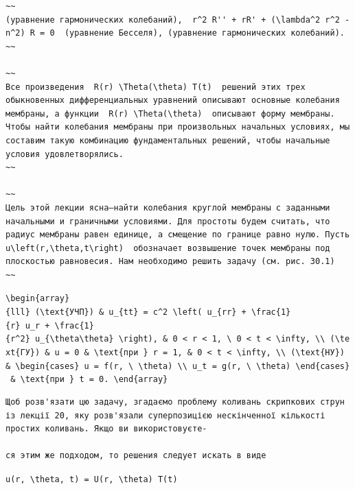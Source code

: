 \documentclass[
  ukrainian,
]{article}
\begin{document}
\begin{verbatim}
~~
(уравнение гармонических колебаний),  r^2 R'' + rR' + (\lambda^2 r^2 - n^2) R = 0  (уравнение Бесселя), (уравнение гармонических колебаний).
~~

~~
Все произведения  R(r) \Theta(\theta) T(t)  решений этих трех обыкновенных дифференциальных уравнений описывают основные колебания мембраны, а функции  R(r) \Theta(\theta)  описывают форму мембраны. Чтобы найти колебания мембраны при произвольных начальных условиях, мы составим такую комбинацию фундаментальных решений, чтобы начальные условия удовлетворялись.
~~

~~
Цель этой лекции ясна—найти колебания круглой мембраны с заданными начальными и граничными условиями. Для простоты будем считать, что радиус мембраны равен единице, а смещение по границе равно нулю. Пусть  u\left(r,\theta,t\right)  обозначает возвышение точек мембраны под плоскостью равновесия. Нам необходимо решить задачу (см. рис. 30.1)
~~
\end{verbatim}

\texttt{\textbackslash{}begin\{array\}\{lll\}\ (\textbackslash{}text\{УЧП\})\ \&\ u\_\{tt\}\ =\ c\^{}2\ \textbackslash{}left(\ u\_\{rr\}\ +\ \textbackslash{}frac\{1\}\{r\}\ u\_r\ +\ \textbackslash{}frac\{1\}\{r\^{}2\}\ u\_\{\textbackslash{}theta\textbackslash{}theta\}\ \textbackslash{}right),\ \&\ 0\ \textless{}\ r\ \textless{}\ 1,\ \textbackslash{}\ 0\ \textless{}\ t\ \textless{}\ \textbackslash{}infty,\ \textbackslash{}\textbackslash{}\ (\textbackslash{}text\{ГУ\})\ \&\ u\ =\ 0\ \&\ \textbackslash{}text\{при\ \}\ r\ =\ 1,\ \&\ 0\ \textless{}\ t\ \textless{}\ \textbackslash{}infty,\ \textbackslash{}\textbackslash{}\ (\textbackslash{}text\{НУ\})\ \&\ \textbackslash{}begin\{cases\}\ u\ =\ f(r,\ \textbackslash{}\ \textbackslash{}theta)\ \textbackslash{}\textbackslash{}\ u\_t\ =\ g(r,\ \textbackslash{}\ \textbackslash{}theta)\ \textbackslash{}end\{cases\}\ \&\ \textbackslash{}text\{при\ \}\ t\ =\ 0.\ \textbackslash{}end\{array\}}

\begin{verbatim}
Щоб розв'язати цю задачу, згадаємо проблему коливань скрипкових струн із лекції 20, яку розв'язали суперпозицією нескінченної кількості простих коливань. Якщо ви використовуєте-

ся этим же подходом, то решения следует искать в виде
\end{verbatim}

\texttt{u(r,\ \textbackslash{}theta,\ t)\ =\ U(r,\ \textbackslash{}theta)\ T(t)}
\end{document}
